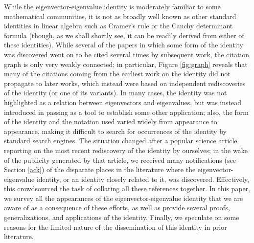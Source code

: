 \documentclass[12pt]{amsart}
\begin{document}
While the eigenvector-eigenvalue identity is moderately familiar to some mathematical communities, it is not as broadly well known as other standard identities in linear algebra such as Cramer's rule \cite{cramer} or the Cauchy determinant formula \cite{cauchy} (though, as we shall shortly see, it can be readily derived from either of these identities).  While several of the papers in which some form of the identity was discovered went on to be cited several times by subsequent work, the citation graph is only very weakly connected; in particular, Figure \ref{fig:graph} reveals that many of the citations coming from the earliest work on the identity did not propagate to later works, which instead were based on independent rediscoveries of the identity (or one of its variants).  In many cases, the identity was not highlighted as a relation between eigenvectors and eigenvalues, but was instead introduced in passing as a tool to establish some other application; also, the form of the identity and the notation used varied widely from appearance to appearance, making it difficult to search for occurrences of the identity by standard search engines.  The situation changed after a popular science article \cite{wolchover-2019} reporting on the most recent rediscovery \cite{Denton:2019ovn, DPTZ} of the identity by ourselves; in the wake of the publicity generated by that article, we received many notifications (see Section \ref{ack}) of the disparate places in the literature where the eigenvector-eigenvalue identity, or an identity closely related to it, was discovered.  Effectively, this crowdsourced the task of collating all these references together.  In this paper, we survey all the appearances of the eigenvector-eigenvalue identity that we are aware of as a consequence of these efforts, as well as provide several proofs, generalizations, and applications of the identity.  Finally, we speculate on some reasons for the limited nature of the dissemination of this identity in prior literature. 
\end{document}

